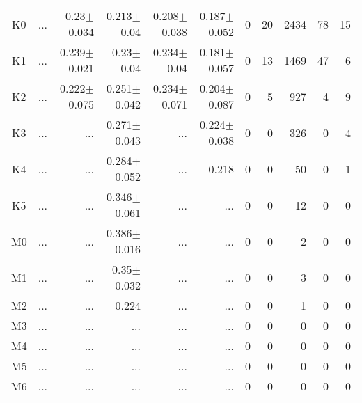 \begin{table}[t]
\begin{center}
\begin{tabular}{c|rrrrr|rrrrr}
K0	&	 ...	&	0.23$\pm$0.034	&	0.213$\pm$0.04	&	0.208$\pm$0.038	&	0.187$\pm$0.052	&	0	&	20	&	2434	&	78	&	15	\\
K1	&	 ...	&	0.239$\pm$0.021	&	0.23$\pm$0.04	&	0.234$\pm$0.04	&	0.181$\pm$0.057	&	0	&	13	&	1469	&	47	&	6	\\
K2	&	 ...	&	0.222$\pm$0.075	&	0.251$\pm$0.042	&	0.234$\pm$0.071	&	0.204$\pm$0.087	&	0	&	5	&	927	&	4	&	9	\\
K3	&	 ...	&	 ...	&	0.271$\pm$0.043	&	 ...	&	0.224$\pm$0.038	&	0	&	0	&	326	&	0	&	4	\\
K4	&	 ...	&	 ...	&	0.284$\pm$0.052	&	 ...	&	0.218	&	0	&	0	&	50	&	0	&	1	\\
K5	&	 ...	&	 ...	&	0.346$\pm$0.061	&	 ...	&	 ...	&	0	&	0	&	12	&	0	&	0	\\
M0	&	 ...	&	 ...	&	0.386$\pm$0.016	&	 ...	&	 ...	&	0	&	0	&	2	&	0	&	0	\\
M1	&	 ...	&	 ...	&	0.35$\pm$0.032	&	 ...	&	 ...	&	0	&	0	&	3	&	0	&	0	\\
M2	&	 ...	&	 ...	&	0.224	&	 ...	&	 ...	&	0	&	0	&	1	&	0	&	0	\\
M3	&	 ...	&	 ...	&	 ...	&	 ...	&	 ...	&	0	&	0	&	0	&	0	&	0	\\
M4	&	 ...	&	 ...	&	 ...	&	 ...	&	 ...	&	0	&	0	&	0	&	0	&	0	\\
M5	&	 ...	&	 ...	&	 ...	&	 ...	&	 ...	&	0	&	0	&	0	&	0	&	0	\\
M6	&	 ...	&	 ...	&	 ...	&	 ...	&	 ...	&	0	&	0	&	0	&	0	&	0	\\
    \bottomrule
    \end{tabular}
\end{center}
\end{table}


